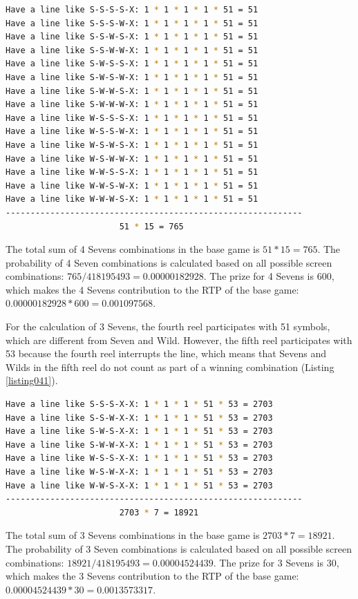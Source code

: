 \documentclass[12pt,twoside,openany]{book}
\begin{document}
\begin{lstlisting}[language=bash, caption={All possible combinations of 4 Sevens}, label=listing040]
Have a line like S-S-S-S-X:	1 * 1 * 1 * 1 * 51 = 51
Have a line like S-S-S-W-X:	1 * 1 * 1 * 1 * 51 = 51
Have a line like S-S-W-S-X:	1 * 1 * 1 * 1 * 51 = 51
Have a line like S-S-W-W-X:	1 * 1 * 1 * 1 * 51 = 51
Have a line like S-W-S-S-X:	1 * 1 * 1 * 1 * 51 = 51
Have a line like S-W-S-W-X:	1 * 1 * 1 * 1 * 51 = 51
Have a line like S-W-W-S-X:	1 * 1 * 1 * 1 * 51 = 51
Have a line like S-W-W-W-X:	1 * 1 * 1 * 1 * 51 = 51
Have a line like W-S-S-S-X:	1 * 1 * 1 * 1 * 51 = 51
Have a line like W-S-S-W-X:	1 * 1 * 1 * 1 * 51 = 51
Have a line like W-S-W-S-X:	1 * 1 * 1 * 1 * 51 = 51
Have a line like W-S-W-W-X:	1 * 1 * 1 * 1 * 51 = 51
Have a line like W-W-S-S-X:	1 * 1 * 1 * 1 * 51 = 51
Have a line like W-W-S-W-X:	1 * 1 * 1 * 1 * 51 = 51
Have a line like W-W-W-S-X:	1 * 1 * 1 * 1 * 51 = 51
------------------------------------------------------------
					   51 * 15 = 765
\end{lstlisting}

The total sum of 4 Sevens combinations in the base game is $51 * 15 = 765$. The probability of 4 Seven combinations is calculated based on all possible screen combinations: $765 / 418195493 = 0.00000182928$. The prize for 4 Sevens is 600, which makes the 4 Sevens contribution to the RTP of the base game: $0.00000182928 * 600 = 0.001097568$.

For the calculation of 3 Sevens, the fourth reel participates with 51 symbols, which are different from Seven and Wild. However, the fifth reel participates with 53 because the fourth reel interrupts the line, which means that Sevens and Wilds in the fifth reel do not count as part of a winning combination (Listing \ref{listing041}).

\begin{lstlisting}[language=bash, caption={All possible combinations of 3 Sevens}, label=listing041]
Have a line like S-S-S-X-X:	1 * 1 * 1 * 51 * 53 = 2703
Have a line like S-S-W-X-X:	1 * 1 * 1 * 51 * 53 = 2703
Have a line like S-W-S-X-X:	1 * 1 * 1 * 51 * 53 = 2703
Have a line like S-W-W-X-X:	1 * 1 * 1 * 51 * 53 = 2703
Have a line like W-S-S-X-X:	1 * 1 * 1 * 51 * 53 = 2703
Have a line like W-S-W-X-X:	1 * 1 * 1 * 51 * 53 = 2703
Have a line like W-W-S-X-X:	1 * 1 * 1 * 51 * 53 = 2703
------------------------------------------------------------
					   2703 * 7 = 18921
\end{lstlisting}

The total sum of 3 Sevens combinations in the base game is $2703 * 7 = 18921$. The probability of 3 Seven combinations is calculated based on all possible screen combinations: $18921 / 418195493 = 0.00004524439$. The prize for 3 Sevens is 30, which makes the 3 Sevens contribution to the RTP of the base game: $0.00004524439 * 30 = 0.0013573317$.
\end{document}

